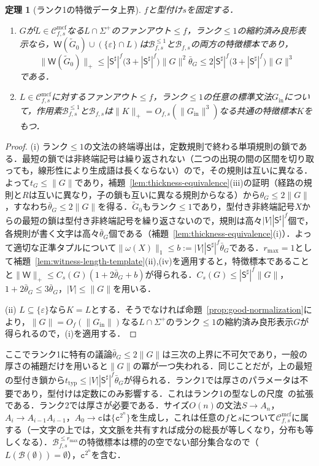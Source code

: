 \documentclass[11pt,a4paper]{ltjsarticle}
\numberwithin{equation}{section}
\theoremstyle{plain}
\newtheorem{theorem}{定理}[section]
\theoremstyle{definition}
\theoremstyle{remark}
\newcommand{\Wit}{\mathsf{W}}
\newcommand{\Cmcf}[2]{\mathcal{C}^{\mathrm{mcf}}_{#1,#2}}
\newcommand{\eps}{\varepsilon}
\begin{document}
\begin{theorem}[ランク1の特徴データ上界]
\label{thm:rankone-polydata}
$f$と型付け$s$を固定する．
\begin{enumerate}[label=\textup{(\roman*)},leftmargin=*]
\item $G$が$L\in\Cmcf{f}{s}$なる$L\cap\Sigma^+$のファンアウト$\le f$，ランク$\le1$の縮約済み良形表示なら，$\Wit(\widetilde G_0)\cup(\{\eps\}\cap L)$は$\mathcal B^{\le1}_{f,s}$と$\mathcal B_{f,s}$の両方の特徴標本であり，
\[
 \|\Wit(\widetilde G_0)\|_+\le|\mathsf S^\sharp|^f\bigl(3+|\mathsf S^\sharp|^f\bigr)
 \|G\|^2\bar\theta_G
 \le2|\mathsf S^\sharp|^f\bigl(3+|\mathsf S^\sharp|^f\bigr)\|G\|^3
\]
である．
\item $L\in\Cmcf{f}{s}$に対するファンアウト$\le f$，ランク$\le1$の任意の標準文法$G_{\mathrm{in}}$について，作用素$\mathcal B^{\le1}_{f,s}$と$\mathcal B_{f,s}$は$\|K\|_+=O_{f,s}(\|G_{\mathrm{in}}\|^3)$なる共通の特徴標本$K$をもつ．
\end{enumerate}
\end{theorem}

\begin{proof}
(i) ランク$\le1$の文法の終端導出は，定数規則で終わる単項規則の鎖である．最短の鎖では非終端記号は繰り返されない（二つの出現の間の区間を切り取っても，線形性により生成語は長くならない）ので，その規則は互いに異なる．よって$t_G\le\|G\|$であり，補題~\ref{lem:thickness-equivalence}(iii)の証明（経路の規則と$R$は互いに異なり，子の鎖も互いに異なる規則からなる）から$\theta_G\le2\|G\|$，すなわち$\bar\theta_G\le2\|G\|$を得る．$\widetilde G_0$もランク$\le1$であり，型付き非終端記号$X$からの最短の鎖は型付き非終端記号を繰り返さないので，規則は高々$|V||\mathsf S^\sharp|^f$個で，各規則が書く文字は高々$\bar\theta_G$個である（補題~\ref{lem:thickness-equivalence}(i)）．よって適切な正準タプルについて$\|\omega(X)\|_1\le b:=|V||\mathsf S^\sharp|^f\bar\theta_G$である．$r_{\max}=1$として補題~\ref{lem:witness-length-template}(ii),(iv)を適用すると，特徴標本であることと$\|\Wit\|_+\le C_s(G)(1+2\bar\theta_G+b)$が得られる．$C_s(G)\le|\mathsf S^\sharp|^f\|G\|$，$1+2\bar\theta_G\le3\bar\theta_G$，$|V|\le\|G\|$を用いる．

(ii) $L\subseteq\{\eps\}$なら$K=L$とする．そうでなければ命題~\ref{prop:good-normalization}により，$\|G\|=O_f(\|G_{\mathrm{in}}\|)$なる$L\cap\Sigma^+$のランク$\le1$の縮約済み良形表示$G$が得られるので，(i)を適用する．
\end{proof}

ここでランク1に特有の議論$\bar\theta_G\le2\|G\|$は三次の上界に不可欠であり，一般の厚さの補題だけを用いると$\|G\|$の冪が一つ失われる．同じことだが，上の最短の型付き鎖から$t_{\mathrm{typ}}\le |V||\mathsf S^\sharp|^f\bar\theta_G$が得られる．ランク1では厚さのパラメータは不要であり，型付けは定数にのみ影響する．これはランク1の型なしの尺度~\cite[Lemma~7]{Yoshinaka2011}の拡張である．ランク2では厚さが必要である．サイズ$O(n)$の文法$S\to A_n$，$A_i\to A_{i-1}A_{i-1}$，$A_0\to\mathtt c$は$\{\mathtt c^{2^n}\}$を生成し，これは任意の$f$と$s$について$\Cmcf{f}{s}$に属する（一文字の上では，文文脈を共有すれば成分の総長が等しくなり，分布も等しくなる）．$\mathcal B^{\le r_{\max}}_{f,s}$の特徴標本は標的の空でない部分集合なので（$L(\mathcal B(\emptyset))=\emptyset$），$\mathtt c^{2^n}$を含む．
\end{document}
